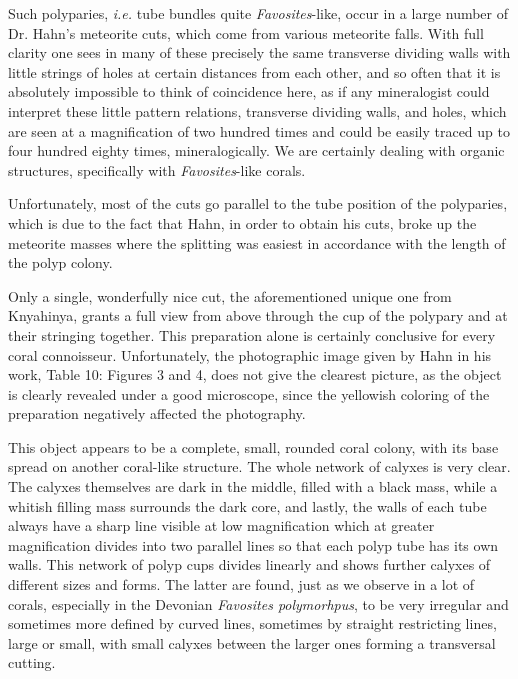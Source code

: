\documentclass[a4paper, 12pt, oneside]{article}
\begin{document}
Such polyparies, \emph{i.e.} tube bundles quite \emph{Favosites}-like, occur in a large number of Dr. Hahn's meteorite cuts, which come from various meteorite falls. With full clarity one sees in many of these precisely the same transverse dividing walls with little strings of holes at certain distances from each other, and so often that it is absolutely impossible to think of coincidence here, as if any mineralogist could interpret these little pattern relations, transverse dividing walls, and holes, which are seen at a magnification of two hundred times and could be easily traced up to four hundred eighty times, mineralogically. We are certainly dealing with organic structures, specifically with \emph{Favosites}-like corals.

Unfortunately, most of the cuts go parallel to the tube position of the polyparies, which is due to the fact that Hahn, in order to obtain his cuts, broke up the meteorite masses where the splitting was easiest in accordance with the length of the polyp colony.

Only a single, wonderfully nice cut, the aforementioned unique one from Knyahinya, grants a full view from above through the cup of the polypary and at their stringing together. This preparation alone is certainly conclusive for every coral connoisseur. Unfortunately, the photographic image given by Hahn in his work, Table 10: Figures 3 and 4, does not give the clearest picture, as the object is clearly revealed under a good microscope, since the yellowish coloring of the preparation negatively affected the photography.

This object appears to be a complete, small, rounded coral colony, with its base spread on another coral-like structure. The whole network of calyxes is very clear. The calyxes themselves are dark in the middle, filled with a black mass, while a whitish filling mass surrounds the dark core, and lastly, the walls of each tube always have a sharp line visible at low magnification which at greater magnification divides into two parallel lines so that each polyp tube has its own walls. This network of polyp cups divides linearly and shows further calyxes of different sizes and forms. The latter are found, just as we observe in a lot of corals, especially in the Devonian \emph{Favosites polymorhpus}, to be very irregular and sometimes more defined by curved lines, sometimes by straight restricting lines, large or small, with small calyxes between the larger ones forming a transversal cutting.
\end{document}
